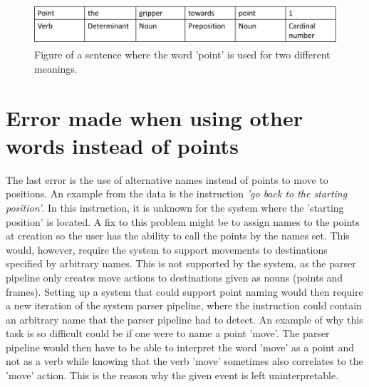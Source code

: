 \begin{figure}[ht]
    \centering
    \includegraphics[width=12cm]{img/POS_is_cool_i_swear.png}
    \caption{Figure of a sentence where the word 'point' is used for two different meanings.}
    \label{fig:POS_COOL}
\end{figure}

\section{Error made when using other words instead of points}
The last error is the use of alternative names instead of points to move to positions. An example from the data is the instruction \textit{'go back to the starting position'}. In this instruction, it is unknown for the system where the 'starting position' is located. A fix to this problem might be to assign names to the points at creation so the user has the ability to call the points by the names set. This would, however, require the system to support movements to destinations specified by arbitrary names. This is not supported by the system, as the parser pipeline only creates move actions to destinations given as nouns (points and frames). Setting up a system that could support point naming would then require a new iteration of the system parser pipeline, where the instruction could contain an arbitrary name that the parser pipeline had to detect. An example of why this task is so difficult could be if one were to name a point 'move'. The parser pipeline would then have to be able to interpret the word 'move' as a point and not as a verb while knowing that the verb 'move' sometimes also correlates to the 'move' action. This is the reason why the given event is left uninterpretable.

